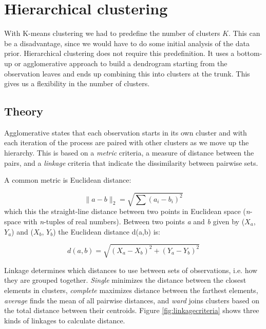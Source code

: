 \section{Hierarchical clustering}

With K-means clustering we had to predefine the number of clusters $K$. This can be a disadvantage, since we would have to do some initial analysis of the data prior. Hierarchical clustering does not require this predefinition. It uses a bottom-up or agglomerative approach to build a dendrogram starting from the observation leaves and ends up combining this into clusters at the trunk. This gives us a flexibility in the number of clusters.

\subsection{Theory}

Agglomerative states that each observation starts in its own cluster and with each iteration of the process are paired with other clusters as we move up the hierarchy.  This is based on a \textit{metric} criteria, a measure of distance between the pairs, and a \textit{linkage} criteria that indicate the dissimilarity between pairwise sets.

\noindent A common metric is Euclidean distance:

\[ \parallel a - b \parallel_{2} = \sqrt{\sum (a_{i} - b_{i})^{2}} \]
which this the straight-line distance between two points in Euclidean space (\textit{n}-space with \textit{n}-tuples of real numbers). Between two points \textit{a} and \textit{b} given by ($X_a$, $Y_a$) and ($X_b$, $Y_b$) the Euclidean distance d(a,b) is:

\[ d(a,b) = \sqrt{(X_a - X_b)^2 + (Y_a - Y_b)^2} \]


\noindent Linkage determines which distances to use between sets of observations, i.e. how they are grouped together. \textit{Single} minimizes the distance between the closest elements in clusters, \textit{complete} maximizes distance between the farthest elements, \textit{average} finds the mean of all pairwise distances, and \textit{ward} joins clusters based on the total distance between their centroids. Figure \ref{fig:linkagecriteria} shows three kinds of linkages to calculate distance.

